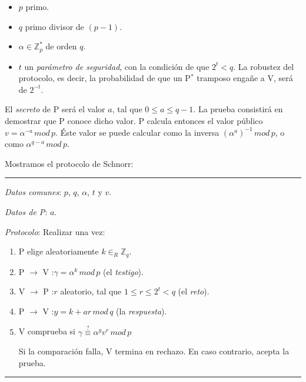 \begin{itemize}
	\item $p$ primo.
	\item $q$ primo divisor de $(p-1)$.
	\item $\alpha \in \mathbb{Z}_p^*$ de orden $q$.
	\item $t$ un \textit{parámetro de seguridad}, con la condición de que $2^t < q$. La robustez del protocolo, es decir, la probabilidad de que un P$^*$ tramposo engañe a V, será de $2^{-t}$.
\end{itemize}


El \textit{secreto} de P será el valor $a$, tal que $0\leq a \leq q-1$. La prueba consistirá en demostrar que P conoce dicho valor. P calcula entonces el valor público $v = \alpha ^{-a} \, mod \, p$. Éste valor se puede calcular como la inversa $\left( \alpha ^{a} \right) ^{-1} \, mod \, p$, o como $\alpha ^{q-a} \, mod \, p$.

Mostramos el protocolo de Schnorr:

\rule{\textwidth}{1pt}
\begin{algorithm}[Schnorr]\label{schnorr:algint}
	
	\hfil
	
	\textit{Datos comunes}: $p$, $q$, $\alpha$, $t$ y $v$.
	
	\textit{Datos de P}: $a$.
	
	\textit{Protocolo}: Realizar una vez:
	
	\begin{enumerate}
		
		\item P elige aleatoriamente $k \in_R \mathbb{Z}_q$.
		
		\item P $\rightarrow$ V :\quad $\gamma = \alpha^k \, mod \, p$ (el \textit{testigo}).
		
		\item V $\rightarrow$ P :\quad $r$ aleatorio, tal que $1\leq r\leq 2^t < q $ (el \textit{reto}).
		
		\item P $\rightarrow$ V :\quad $y = k + ar \, mod \, q$ (la \textit{respuesta}).
		
		\item V comprueba si $\gamma \overset{?}{\equiv} \alpha^y v^r \, mod \, p$
		
		Si la comparación falla, V termina en rechazo. En caso contrario, acepta la prueba.
		
		
	\end{enumerate}
	
\end{algorithm}
\rule{\textwidth}{1pt}

